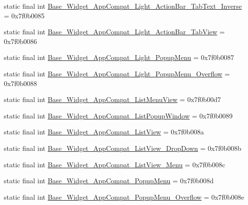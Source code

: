 \begin{CompactItemize}
static final int \hyperlink{classandroid_1_1support_1_1graphics_1_1drawable_1_1_r_1_1style_60b4878e1f92c2d9c1890ba808c53c39}{Base\_\-Widget\_\-AppCompat\_\-Light\_\-ActionBar\_\-TabText\_\-Inverse} = 0x7f0b0085
\item 
static final int \hyperlink{classandroid_1_1support_1_1graphics_1_1drawable_1_1_r_1_1style_f91a45bfe2e17190d0c6571c18e29a9b}{Base\_\-Widget\_\-AppCompat\_\-Light\_\-ActionBar\_\-TabView} = 0x7f0b0086
\item 
static final int \hyperlink{classandroid_1_1support_1_1graphics_1_1drawable_1_1_r_1_1style_f33cab8ab10466ca9dc45081a3063c68}{Base\_\-Widget\_\-AppCompat\_\-Light\_\-PopupMenu} = 0x7f0b0087
\item 
static final int \hyperlink{classandroid_1_1support_1_1graphics_1_1drawable_1_1_r_1_1style_f8cf7bc95f619940e845012c46f90217}{Base\_\-Widget\_\-AppCompat\_\-Light\_\-PopupMenu\_\-Overflow} = 0x7f0b0088
\item 
static final int \hyperlink{classandroid_1_1support_1_1graphics_1_1drawable_1_1_r_1_1style_b238a95f0218ddecb669d8e0e8c8a8a4}{Base\_\-Widget\_\-AppCompat\_\-ListMenuView} = 0x7f0b00d7
\item 
static final int \hyperlink{classandroid_1_1support_1_1graphics_1_1drawable_1_1_r_1_1style_f22f41d17119676a3dba1f65d3c3aced}{Base\_\-Widget\_\-AppCompat\_\-ListPopupWindow} = 0x7f0b0089
\item 
static final int \hyperlink{classandroid_1_1support_1_1graphics_1_1drawable_1_1_r_1_1style_02465cf715b23a6dea2123c17a2890ce}{Base\_\-Widget\_\-AppCompat\_\-ListView} = 0x7f0b008a
\item 
static final int \hyperlink{classandroid_1_1support_1_1graphics_1_1drawable_1_1_r_1_1style_ffe9df2f7beb9fd132921d8a595a7791}{Base\_\-Widget\_\-AppCompat\_\-ListView\_\-DropDown} = 0x7f0b008b
\item 
static final int \hyperlink{classandroid_1_1support_1_1graphics_1_1drawable_1_1_r_1_1style_43a73b0699d30b1f752208483e49854d}{Base\_\-Widget\_\-AppCompat\_\-ListView\_\-Menu} = 0x7f0b008c
\item 
static final int \hyperlink{classandroid_1_1support_1_1graphics_1_1drawable_1_1_r_1_1style_899d3e13f902e529e5064a73fe7fe627}{Base\_\-Widget\_\-AppCompat\_\-PopupMenu} = 0x7f0b008d
\item 
static final int \hyperlink{classandroid_1_1support_1_1graphics_1_1drawable_1_1_r_1_1style_d846d6f65f4ae1608dd3345a207a0119}{Base\_\-Widget\_\-AppCompat\_\-PopupMenu\_\-Overflow} = 0x7f0b008e
\item 

\end{CompactItemize}
